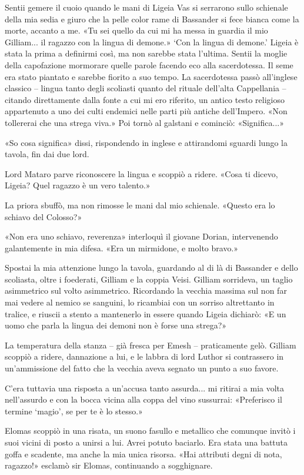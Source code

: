 Sentii gemere il cuoio quando le mani di Ligeia Vas si serrarono sullo
schienale della mia sedia e giuro che la pelle color rame di Bassander
si fece bianca come la morte, accanto a me. «Tu sei quello da cui mi ha
messa in guardia il mio Gilliam... il ragazzo con la lingua di demone.»
`Con la lingua di demone.' Ligeia è stata la prima a definirmi così, ma
non sarebbe stata l'ultima. Sentii la moglie della capofazione mormorare
quelle parole facendo eco alla sacerdotessa. Il seme era stato piantato
e sarebbe fiorito a suo tempo. La sacerdotessa passò all'inglese
classico -- lingua tanto degli scoliasti quanto del rituale dell'alta
Cappellania -- citando direttamente dalla fonte a cui mi ero riferito,
un antico testo religioso appartenuto a uno dei culti endemici nelle
parti più antiche dell'Impero. «Non tollererai che una strega viva.» Poi
tornò al galstani e cominciò: «Significa...»

«So cosa significa» dissi, rispondendo in inglese e attirandomi sguardi
lungo la tavola, fin dai due lord.

Lord Mataro parve riconoscere la lingua e scoppiò a ridere. «Cosa ti
dicevo, Ligeia? Quel ragazzo è un vero talento.»

La priora sbuffò, ma non rimosse le mani dal mio schienale. «Questo era
lo schiavo del Colosso?»

«Non era uno schiavo, reverenza» interloquì il giovane Dorian,
intervenendo galantemente in mia difesa. «Era un mirmidone, e molto
bravo.»

Spostai la mia attenzione lungo la tavola, guardando al di là di
Bassander e dello scoliasta, oltre i foederati, Gilliam e la coppia
Veisi. Gilliam sorrideva, un taglio asimmetrico sul volto asimmetrico.
Ricordando la vecchia massima sul non far mai vedere al nemico se
sanguini, lo ricambiai con un sorriso altrettanto in tralice, e riuscii
a stento a mantenerlo in essere quando Ligeia dichiarò: «E un uomo che
parla la lingua dei demoni non è forse una strega?»

La temperatura della stanza -- già fresca per Emesh -- praticamente
gelò. Gilliam scoppiò a ridere, dannazione a lui, e le labbra di lord
Luthor si contrassero in un'ammissione del fatto che la vecchia aveva
segnato un punto a suo favore.

C'era tuttavia una risposta a un'accusa tanto assurda... mi ritirai a
mia volta nell'assurdo e con la bocca vicina alla coppa del vino
sussurrai: «Preferisco il termine `magio', se per te è lo stesso.»

Elomas scoppiò in una risata, un suono fasullo e metallico che comunque
invitò i suoi vicini di posto a unirsi a lui. Avrei potuto baciarlo. Era
stata una battuta goffa e scadente, ma anche la mia unica risorsa. «Hai
attributi degni di nota, ragazzo!» esclamò sir Elomas, continuando a
sogghignare.

